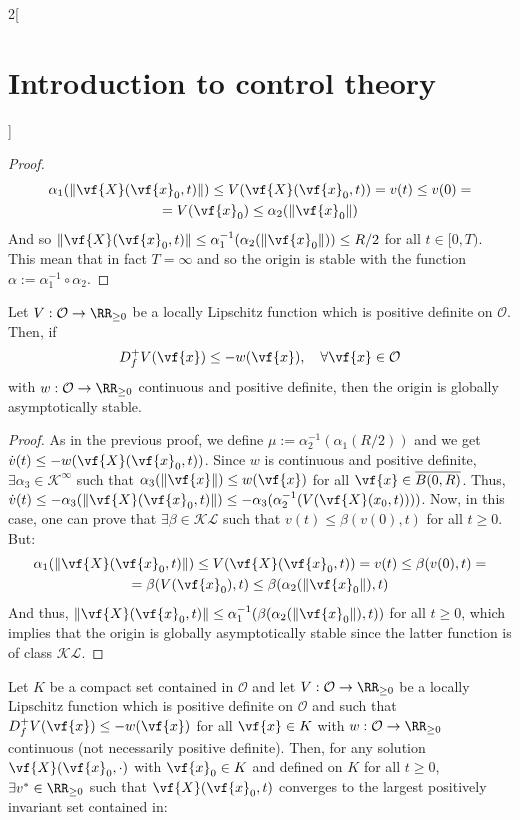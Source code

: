 \documentclass[../../../main_math.tex]{subfiles}
\begin{document}
\begin{multicols}{2}[\section{Introduction to control theory}]
\begin{proof}
    \begin{multline*}
      \alpha_1(\norm{\vf{X}(\vf{x}_0, t)})\leq V(\vf{X}(\vf{x}_0, t))=v(t) \leq v(0)=\\ = V(\vf{x}_0) \leq \alpha_2(\norm{\vf{x}_0})
    \end{multline*}
    And so $\norm{\vf{X}(\vf{x}_0, t)}\leq \alpha_1^{-1}(\alpha_2(\norm{\vf{x}_0}))\leq R/2$ for all $t\in[0, T)$. This mean that in fact $T=\infty$ and so the origin is stable with the function $\alpha:=\alpha_1^{-1}\circ\alpha_2$.
  \end{proof}
  \begin{theorem}
    Let $V:\mathcal{O}\to \RR_{\geq 0}$ be a locally Lipschitz function which is positive definite on $\mathcal{O}$. Then, if
    $$
      D_f^+V(\vf{x})\leq -w(\vf{x}), \quad \forall \vf{x}\in \mathcal{O}
    $$
    with $w:\mathcal{O}\to \RR_{\geq 0}$ continuous and positive definite, then the origin is globally asymptotically stable.
  \end{theorem}
  \begin{proof}
    As in the previous proof, we define $\mu:=\alpha_2^{-1}(\alpha_1(R/2))$ and we get $\dot{v}(t)\leq -w(\vf{X}(\vf{x}_0, t))$. Since $w$ is continuous and positive definite, $\exists \alpha_3\in\mathcal{K}^\infty$ such that $\alpha_3(\norm{\vf{x}})\leq w(\vf{x})$ for all $\vf{x}\in \overline{B(0,R)}$. Thus, $\dot{v}(t) \leq -\alpha_3(\norm{\vf{X}(\vf{x}_0, t)})\leq -\alpha_3(\alpha_2^{-1}(V(\vf{X}(x_0, t))))$. Now, in this case, one can prove that $\exists \beta \in \mathcal{KL}$ such that $v(t)\leq \beta(v(0), t)$ for all $t\geq 0$. But:
    \begin{multline*}
      \alpha_1(\norm{\vf{X}(\vf{x}_0, t)})\leq V(\vf{X}(\vf{x}_0, t))=v(t) \leq \beta(v(0), t)=\\ = \beta(V(\vf{x}_0), t)\leq \beta(\alpha_2(\norm{\vf{x}_0}), t)
    \end{multline*}
    And thus, $\norm{\vf{X}(\vf{x}_0, t)}\leq \alpha_1^{-1}(\beta(\alpha_2(\norm{\vf{x}_0}), t))$ for all $t\geq 0$, which implies that the origin is globally asymptotically stable since the latter function is of class $\mathcal{KL}$.
  \end{proof}
  \begin{theorem}
    Let $K$ be a compact set contained in $\mathcal{O}$ and let $V:\mathcal{O}\to \RR_{\geq 0}$ be a locally Lipschitz function which is positive definite on $\mathcal{O}$ and such that $D_f^+V(\vf{x})\leq -w(\vf{x})$ for all $\vf{x}\in K$ with $w:\mathcal{O}\to \RR_{\geq 0}$ continuous (not necessarily positive definite). Then, for any solution $\vf{X}(\vf{x}_0, \cdot)$ with $\vf{x}_0\in K$ and defined on $K$ for all $t\geq 0$, $\exists v^*\in\RR_{\geq 0}$ such that $\vf{X}(\vf{x}_0, t)$ converges to the largest positively invariant set contained in:

\end{theorem}
\end{multicols}
\end{document}

